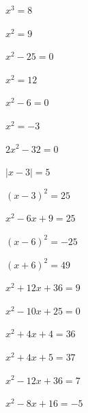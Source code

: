 \begin{bbwAufgabenBlock}
\item $x^3=8$

\item $x^2 = 9$

\item $x^2-25 = 0$

\item $x^2 = 12$

\item $x^2 - 6 = 0$

\item $x^2=-3$
\LoesungsBlock{$\lx=\{ \}$}

\item $2x^2-32 = 0$

\item $|x-3| = 5$

\item $(x-3)^2 = 25 $

\item $x^2-6x+9 = 25$

\item $(x-6)^2 = -25 $
\LoesungsBlock{$\lx = \left\{ \right\}$}

\item $(x+6)^2 = 49$

\item $x^2+12x+36 = 9 $

\item $x^2-10x+25 = 0  $
\LoesungsBlock{$\lx = \left\{ +5 \right\}$}

\item $x^2 + 4x +4 = 36$

\item $x^2+4x+5 = 37$

\item $x^2 -12 x + 36 = 7$

\item $ x^2 - 8x + 16= -5$
\LoesungsBlock{$\lx = \left\{ \right\}$}


\end{bbwAufgabenBlock}
